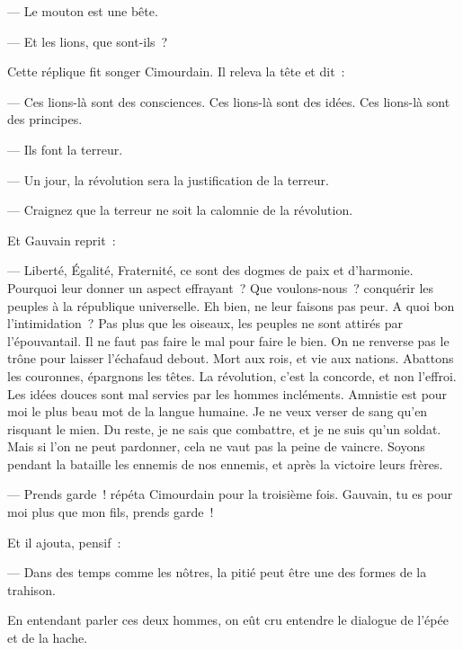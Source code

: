 \documentclass[french,twoside]{book} %
\begin{document}
— Le mouton est une bête.\par
— Et les lions, que sont-ils ?\par
Cette réplique fit songer Cimourdain. Il releva la tête et dit :\par
— Ces lions-là sont des consciences. Ces lions-là sont des idées. Ces lions-là sont des principes.\par
— Ils font la terreur.\par
— Un jour, la révolution sera la justification de la terreur.\par
— Craignez que la terreur ne soit la calomnie de la révolution.\par
 Et Gauvain reprit :\par
— Liberté, Égalité, Fraternité, ce sont des dogmes de paix et d’harmonie. Pourquoi leur donner un aspect effrayant ? Que voulons-nous ? conquérir les peuples à la république universelle. Eh bien, ne leur faisons pas peur. A quoi bon l’intimidation ? Pas plus que les oiseaux, les peuples ne sont attirés par l’épouvantail. Il ne faut pas faire le mal pour faire le bien. On ne renverse pas le trône pour laisser l’échafaud debout. Mort aux rois, et vie aux nations. Abattons les couronnes, épargnons les têtes. La révolution, c’est la concorde, et non l’effroi. Les idées douces sont mal servies par les hommes incléments. Amnistie est pour moi le plus beau mot de la langue humaine. Je ne veux verser de sang qu’en risquant le mien. Du reste, je ne sais que combattre, et je ne suis qu’un soldat. Mais si l’on ne peut pardonner, cela ne vaut pas la peine de vaincre. Soyons pendant la bataille les ennemis de nos ennemis, et après la victoire leurs frères.\par
— Prends garde ! répéta Cimourdain pour la troisième fois. Gauvain, tu es pour moi plus que mon fils, prends garde !\par
Et il ajouta, pensif :\par
— Dans des temps comme les nôtres, la pitié peut être une des formes de la trahison.\par
En entendant parler ces deux hommes, on eût cru entendre le dialogue de l’épée et de la hache.
\end{document}

